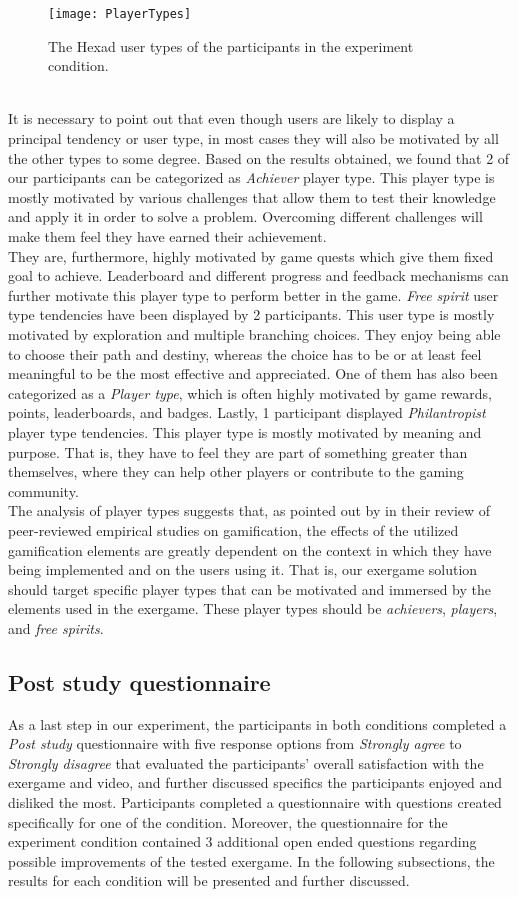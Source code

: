 \begin{figure}[h]
    \centering
    \texttt{[image: PlayerTypes]}
    \caption{The Hexad user types of the participants in the experiment condition.}
    \label{fig:playerTypes}
\end{figure}\\ It is necessary to point out that even though users are likely to display a principal tendency or user type, in most cases they will also be motivated by all the other types to some degree. Based on the results obtained, we found that 2  of our participants can be categorized as \textit{Achiever} player type. This player type is mostly motivated by various challenges that allow them to test their knowledge and apply it in order to solve a problem. Overcoming different challenges will make them feel they have earned their achievement. \\They are, furthermore, highly motivated by game quests which give them fixed goal to achieve. Leaderboard and different progress and feedback mechanisms can further motivate this player type to perform better in the game. \textit{Free spirit} user type tendencies have been displayed by 2 participants. This user type is mostly motivated by exploration and multiple branching choices. They enjoy being able to choose their path and destiny, whereas the choice has to be or at least feel meaningful to be the most effective and appreciated. One of them has also been categorized as a \textit{Player type}, which is often highly motivated by game rewards, points, leaderboards, and badges. Lastly, 1 participant displayed \textit{Philantropist} player type tendencies. This player type is mostly motivated by meaning and purpose. That is, they have to feel they are part of something greater than themselves, where they can help other players or contribute to the gaming community. \\ 
The analysis of player types suggests that, as pointed out by \cite{hamari2014does} in their review of peer-reviewed empirical studies on gamification, the effects of the utilized gamification elements are greatly dependent on the context in which they have being implemented and on the users using it. That is, our exergame solution should target specific player types that can be motivated and immersed by the elements used in the exergame. These player types should be \textit{achievers}, \textit{players}, and \textit{free spirits}.
\subsection{Post study questionnaire}
As a last step in our experiment, the participants in both conditions completed  a \textit{Post study} questionnaire with five response options from \textit{Strongly agree} to \textit{Strongly disagree} that evaluated the participants' overall satisfaction with the exergame and video, and further discussed specifics the participants enjoyed and disliked the most. Participants completed a questionnaire with questions created specifically for one of the condition. Moreover, the questionnaire for the experiment condition contained 3 additional open ended questions regarding possible improvements of the tested exergame. In the following subsections, the results for each condition will be presented and further discussed.
